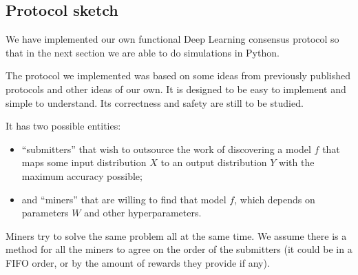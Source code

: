 \documentclass[conference]{IEEEtran}
\begin{document}
\subsection{Protocol sketch}

We have implemented our own functional Deep Learning consensus protocol so that in the next section we are able to do simulations in Python.

The protocol we implemented was based on some ideas from previously published protocols and other ideas of our own. It is designed to be easy to implement and simple to understand. Its correctness and safety are still to be studied.

It has two possible entities:

\begin{itemize}
\item ``submitters'' that wish to outsource the work of discovering a model $f$ that maps some input distribution $X$ to an output distribution $Y$ with the maximum accuracy possible;
\item and ``miners'' that are willing to find that model $f$, which depends on parameters $W$ and other hyperparameters.
\end{itemize} 
Miners try to solve the same problem all at the same time. We assume there is a method for all the miners to agree on the order of the submitters (it could be in a FIFO order, or by the amount of rewards they provide if any).
\end{document}
